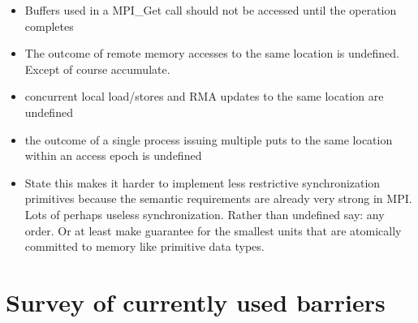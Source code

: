 \documentclass[a4paper, 10pt]{article}
\begin{document}
\begin{itemize}
\begin{itemize}
\begin{itemize}
\begin{itemize}
							\item Buffers used in a MPI\_Get call should not be accessed until the operation completes
							\item The outcome of remote memory accesses to the same location is undefined. Except of course accumulate.
							\item concurrent local load/stores and RMA updates to the same location are undefined
							\item the outcome of a single process issuing multiple puts to the same location within an access epoch is undefined
							\item State this makes it harder to implement less restrictive synchronization primitives because the semantic requirements are already very strong in MPI. Lots of perhaps useless synchronization. Rather than undefined say: any order. Or at least make guarantee for the smallest units that are atomically committed to memory like primitive data types.
						\end{itemize}
				\end{itemize}
		\end{itemize}
\end{itemize}

\section{Survey of currently used barriers}

\end{document}
